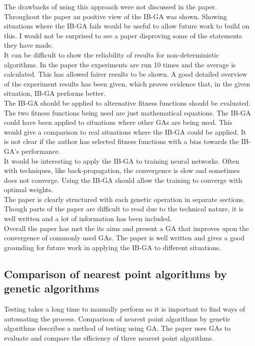 \documentclass[10pt,a4paper,openbib]{article}
\begin{document}
\begin{multicols}{2}
\noindent The drawbacks of using this approach were not discussed in the paper. Throughout the paper an positive view of the IB-GA was shown. Showing situations where the IB-GA fails would be useful to allow future work to build on this. I would not be surprised to see a paper disproving some of the statements they have made. \\

\noindent It can be difficult to show the reliability of results for non-deterministic algorithms. In the paper the experiments are run 10 times and the average is calculated. This has allowed fairer results to be shown. A good detailed overview of the experiment results has been given, which proves evidence that, in the given situation, IB-GA performs better.\\

\noindent The IB-GA should be applied to alternative fitness functions should be evaluated. The two fitness functions being used are just mathematical equations. The IB-GA could have been applied to situations where other GAs are being used. This would give a comparison to real situations where the IB-GA could be applied. It is not clear if the author has selected fitness functions with a bias towards the IB-GA's performance. \\

\noindent It would be interesting to apply the IB-GA to training neural networks. Often with techniques, like back-propagation, the convergence is slow and sometimes does not converge. Using the IB-GA should allow the training to converge with optimal weights. \\

\noindent The paper is clearly structured with each genetic operation in separate sections. Though parts of the paper are difficult to read due to the technical nature, it is well written and a lot of information has been included.\\

\noindent Overall the paper has met the its aims and present a GA that improves upon the convergence of commonly used GAs. The paper is well written and gives a good grounding for future work in applying the IB-GA to different situations. 

\subsection{Comparison of nearest point algorithms by genetic algorithms \cite{nearestPoint}}
Testing takes a long time to manually perform so it is important to find ways of automating the process. Comparison of nearest point algorithms by genetic algorithms\cite{nearestPoint} describes a method of testing using GA. The paper uses GAs to evaluate and compare the efficiency of three nearest point algorithms. \\


\end{multicols}
\end{document}
